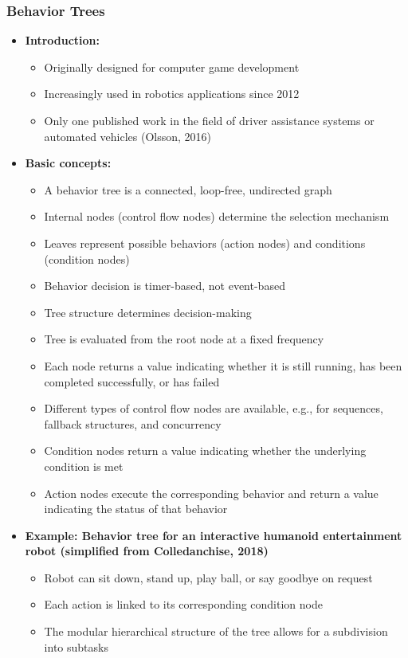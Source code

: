 \subsubsection*{Behavior Trees}

\begin{itemize}
\item \textbf{Introduction:}
\begin{itemize}
    \item Originally designed for computer game development
    \item Increasingly used in robotics applications since 2012
    \item Only one published work in the field of driver assistance systems or automated vehicles (Olsson, 2016)
\end{itemize}

\item \textbf{Basic concepts:}
\begin{itemize}
    \item A behavior tree is a connected, loop-free, undirected graph
    \item Internal nodes (control flow nodes) determine the selection mechanism
    \item Leaves represent possible behaviors (action nodes) and conditions (condition nodes)
    \item Behavior decision is timer-based, not event-based
    \item Tree structure determines decision-making
    \item Tree is evaluated from the root node at a fixed frequency
    \item Each node returns a value indicating whether it is still running, has been completed successfully, or has failed
    \item Different types of control flow nodes are available, e.g., for sequences, fallback structures, and concurrency
    \item Condition nodes return a value indicating whether the underlying condition is met
    \item Action nodes execute the corresponding behavior and return a value indicating the status of that behavior
\end{itemize}

\item \textbf{Example: Behavior tree for an interactive humanoid entertainment robot (simplified from Colledanchise, 2018)}
\begin{itemize}
    \item Robot can sit down, stand up, play ball, or say goodbye on request
    \item Each action is linked to its corresponding condition node
    \item The modular hierarchical structure of the tree allows for a subdivision into subtasks
\end{itemize}


\end{itemize}
